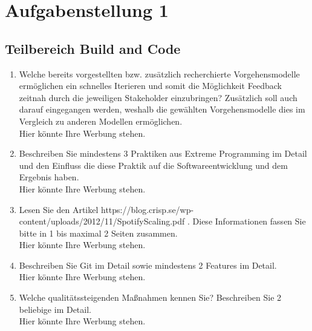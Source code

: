 \newpage
\section{Aufgabenstellung 1}

                      


\subsection{Teilbereich Build and Code}

\begin{enumerate}
    \item Welche bereits vorgestellten bzw. zusätzlich recherchierte Vorgehensmodelle ermöglichen ein
    schnelles Iterieren und somit die Möglichkeit Feedback zeitnah durch die jeweiligen Stakeholder
    einzubringen? Zusätzlich soll auch darauf eingegangen werden, weshalb die gewählten
    Vorgehensmodelle dies im Vergleich zu anderen Modellen ermöglichen. \\

	Hier könnte Ihre Werbung stehen.\\
    
    \item Beschreiben Sie mindestens 3 Praktiken aus Extreme Programming im Detail und den Einfluss
    die diese Praktik auf die Softwareentwicklung und dem Ergebnis haben.\\

	Hier könnte Ihre Werbung stehen.\\

    \item Lesen Sie den Artikel https://blog.crisp.se/wp-content/uploads/2012/11/SpotifyScaling.pdf .
    Diese Informationen fassen Sie bitte in 1 bis maximal 2 Seiten zusammen. \\

	Hier könnte Ihre Werbung stehen.\\

    \item Beschreiben Sie Git im Detail sowie mindestens 2 Features im Detail. \\
  
	Hier könnte Ihre Werbung stehen.\\

    \item Welche qualitätssteigenden Maßnahmen kennen Sie? Beschreiben Sie 2 beliebige im Detail. \\

	Hier könnte Ihre Werbung stehen.\\
\end{enumerate}

